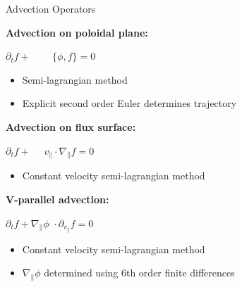 \documentclass{beamer}
\begin{document}
\begin{frame}{Advection Operators}
\begin{minipage}[t]{.5\textwidth}
 \bf Advection on poloidal plane:
 \end{minipage}
 \hspace{.05\textwidth}
 \begin{minipage}[t]{.35\textwidth}
 $\partial_t f + \,\,\,\,\,\,\,\,\,\,\,\,\, \{\phi, f\} = 0$
\end{minipage}
 
 \begin{itemize}
   \item Semi-lagrangian method
   \item Explicit second order Euler determines trajectory
  \end{itemize}
  
\begin{minipage}[t]{.45\textwidth}
 \bf Advection on flux surface:
 \end{minipage}
 \hspace{.1\textwidth}
 \begin{minipage}[t]{.4\textwidth}
 $\partial_t f + \,\,\,\,\,\,\,\, v_\parallel \cdot \nabla_\parallel f = 0$
\end{minipage}
 
 \begin{itemize}
   \item Constant velocity semi-lagrangian method
  \end{itemize}
  
\begin{minipage}[t]{.45\textwidth}
 \bf V-parallel advection:
 \end{minipage}
 \hspace{.1\textwidth}
 \begin{minipage}[t]{.4\textwidth}
 $\partial_t f + \nabla_\parallel \phi\,\, \cdot \partial_{v_{\parallel}} f = 0$
\end{minipage}
 
 \begin{itemize}
   \item Constant velocity semi-lagrangian method
   \item $\nabla_\parallel \phi$ determined using 6th order finite differences
  \end{itemize}
  
\end{frame}
\end{document}
